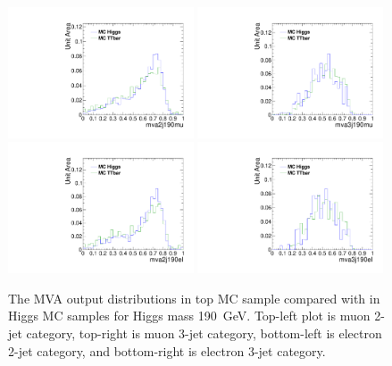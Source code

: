 \begin{figure}[!t]
  \centering
  \includegraphics[width=0.49\textwidth]{figs/cl-mva2j190mu-mvaTopvsHiggs.pdf}
  \includegraphics[width=0.49\textwidth]{figs/cl-mva3j190mu-mvaTopvsHiggs.pdf}
  \includegraphics[width=0.49\textwidth]{figs/cl-mva2j190el-mvaTopvsHiggs.pdf}
  \includegraphics[width=0.49\textwidth]{figs/cl-mva3j190el-mvaTopvsHiggs.pdf}
  \caption{\label{fig:mva:sigvsttbar-mva2j190}The MVA output
    distributions in top MC sample compared with in Higgs MC
    samples for Higgs mass 190~GeV. Top-left plot is muon 2-jet category,
    top-right is muon 3-jet category, bottom-left is electron 2-jet
    category, and bottom-right is electron 3-jet category. }
\end{figure}

